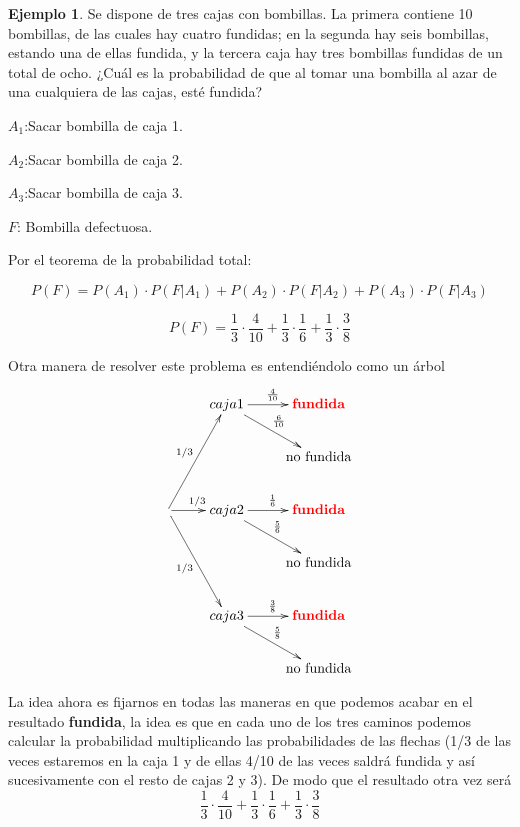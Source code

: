 \documentclass[]{book}
\theoremstyle{plain}
\theoremstyle{definition}
\newtheorem{example}[theorem]{Ejemplo}
\theoremstyle{definition} %
\begin{document}
\begin{example}
  Se dispone de tres cajas con bombillas. La primera contiene 10
bombillas, de las cuales hay cuatro fundidas; en la segunda hay seis
bombillas, estando una de ellas fundida, y la tercera caja hay tres
bombillas fundidas de un total de ocho. ¿Cuál es la probabilidad de que
al tomar una bombilla al azar de una cualquiera de las cajas, esté
fundida?

\(A_1\):Sacar bombilla de caja 1.

\(A_2\):Sacar bombilla de caja 2.

\(A_3\):Sacar bombilla de caja 3.

\(F\): Bombilla defectuosa.

Por el teorema de la probabilidad total:

\[{P(F)=P(A_1)\cdot P(F|A_1) + P(A_2)\cdot P(F|A_2)+ P(A_3)\cdot P(F|A_3)}\]

\[P(F)=\frac{1}{3}\cdot \frac{4}{10} + \frac{1}{3}\cdot \frac{1}{6} + \frac{1}{3}\cdot \frac{3}{8}\]

Otra manera de resolver este problema es entendiéndolo como un árbol
\[ 
\xymatrix{
                       &caja 1 \ar[r]^{\frac{4}{10}} \ar[rd]^{\frac{6}{10}}& \text{\textbf{\textcolor{red}{fundida}}} \\
                       &                       & \text{no fundida}  \\
  \ar[ruu]^{1/3}\ar[r]^{1/3}\ar[rdd]_{1/3}&caja 2  \ar[r]^{\frac{1}{6}} \ar[rd]^{\frac{5}{6}}& \text{\textbf{\textcolor{red}{fundida}}}  \\
                       &                       & \text{no fundida}  \\
                       &caja 3  \ar[r]^{\frac{3}{8}} \ar[rd]^{\frac{5}{8}}& \text{\textbf{\textcolor{red}{fundida}}} \\
                       &                       & \text{no fundida}  
}
\]

La idea ahora es fijarnos en todas las maneras en que podemos acabar en el resultado \textbf{fundida}, la idea es que en cada uno de los tres caminos podemos 
calcular la probabilidad multiplicando las probabilidades de las flechas (1/3 de las veces estaremos en la caja 1 y de
 ellas 4/10 de las veces saldrá fundida y así sucesivamente con el resto de cajas 2 y 3). De modo que el resultado otra vez será 
 \[\frac{1}{3}\cdot \frac{4}{10} + \frac{1}{3}\cdot \frac{1}{6} + \frac{1}{3}\cdot \frac{3}{8}\]
\end{example}
\end{document}
